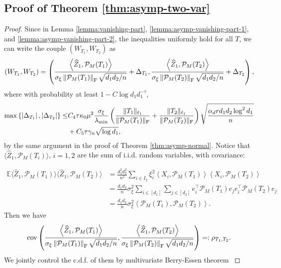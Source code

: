 \documentclass[12pt]{article}
\newcommand{\tF}{{\rm F}}
\newcommand{\abs}[1]{\left\lvert#1\right\rvert}
\newcommand{\norm}[1]{\left\lVert#1\right\rVert}
\newcommand{\E}{\mathbb{E}}
\newcommand{\cP}{\mathcal{P}}
\theoremstyle{plain}
\begin{document}
\subsection{Proof of Theorem \ref{thm:asymp-two-var}}
\begin{proof}
Since in Lemma \ref{lemma:vanishing-part}, \ref{lemma:asymp-vanishing-part-1}, and \ref{lemma:asymp-vanishing-part-2}, the inequalities uniformly hold for all $T$, we can write the couple $(W_{T_1},W_{T_2})$ as 
$$
(W_{T_1},W_{T_2}) = \left(\frac{\left\langle  \widehat{Z}_1 , \cP_M(T_1) \right\rangle }{\sigma_{\xi} \norm{\cP_M(T_1) }_\tF  \sqrt{d_1 d_2/n}}+ \Delta_{T_1}, \frac{\left\langle  \widehat{Z}_1 , \cP_M(T_2) \right\rangle }{\sigma_{\xi} \norm{\cP_M(T_2) }_\tF  \sqrt{d_1 d_2/n}}+ \Delta_{T_2} \right),
$$
where with probability at least $1-C\log d_1 d_1^{-\tau}  $,
\begin{equation}\label{eq:2-d-remainder}
\begin{aligned}
     \max\left\{\abs{\Delta_{T_1}}, \abs{\Delta_{T_2}}\right\} \le & C_4\tau\kappa_0 \mu^2 \frac{\sigma_{\xi} }{ \lambda_{\min} }\left(\frac{\|T_1\|_{\ell_1}}{\| \cP_M(T_1)\|_\tF}+\frac{\|T_2\|_{\ell_1}}{\| \cP_M(T_2)\|_\tF}\right)   \sqrt{\frac{\alpha_d r d_1 d_2 \log ^2 d_1}{n}}\\
     & + C_5\tau\gamma_{n}\sqrt{\log d_1},
\end{aligned}
\end{equation}
by the same argument in the proof of Theorem \ref{thm:asymp-normal}. Notice that $\langle\widehat{Z}_1,\cP_M(T_i) \rangle$, $i=1,2$ are the sum of i.i.d. random variables, with covariance:

\begin{equation*}
\begin{aligned}
         \E \langle\widehat{Z}_1,\cP_M(T_1) \rangle \langle\widehat{Z}_1,\cP_M(T_2) \rangle &= \frac{ d_1^2 d_2^2}{n^2} \sum_{i\in I_2} \xi_i^2 \left\langle  X_i, \cP_M(T_1) \right\rangle\left\langle X_i, \cP_M(T_2) \right\rangle \\
         & = \frac{ d_1 d_2}{n} \sigma_{\xi}^2 \sum_{i\in [d_1]}\sum_{j\in [d_2]} e_i^\top \cP_M(T_1)e_j e_i^\top \cP_M(T_2)e_j \\
         & = \frac{ d_1 d_2}{n} \sigma_{\xi}^2\left\langle  \cP_M(T_1), \cP_M(T_2) \right\rangle.
\end{aligned}
\end{equation*}
Then we have 
\begin{equation*}
    \operatorname{cov}\left(\frac{\left\langle  \widehat{Z}_1 , \cP_M(T_1) \right\rangle }{\sigma_{\xi} \norm{\cP_M(T_1) }_\tF  \sqrt{d_1 d_2/n}}, \frac{\left\langle  \widehat{Z}_1 , \cP_M(T_2) \right\rangle }{\sigma_{\xi} \norm{\cP_M(T_2) }_\tF  \sqrt{d_1 d_2/n}} \right) =:\rho_{T_1, T_2}.
\end{equation*}
We jointly control the c.d.f. of them by multivariate Berry-Essen theorem \citep{stein1972bound,raivc2019multivariate}


\end{proof}
\end{document}
